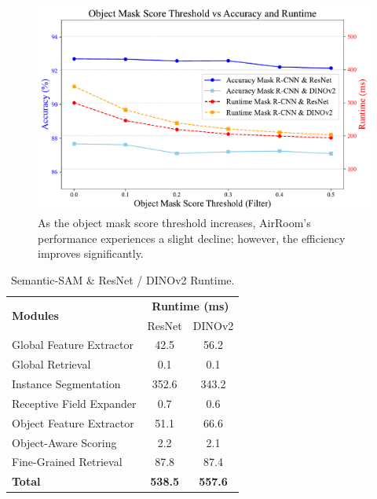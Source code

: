 \begin{table}[ht]
\centering
{}
\caption{Mask R-CNN \& ResNet / DINOv2 Accuracy.}
\label{tab:module_accuracy}
\end{table}

\begin{figure}[ht]
    \centering
    \includegraphics[width=\columnwidth]{runtime.pdf}
    \caption{As the object mask score threshold increases, AirRoom's performance experiences a slight decline; however, the efficiency improves significantly.}
    \label{fig:runtime}
\end{figure}

\begin{table}[ht]
\centering
\begin{tabular}{l|cc}
\toprule
\multirow{2}{*}{\textbf{Modules}} & \multicolumn{2}{c}{\textbf{Runtime (ms)}} \\
 & ResNet & DINOv2 \\
\midrule
Global Feature Extractor & 42.5 & 56.2 \\
Global Retrieval & 0.1 & 0.1 \\
Instance Segmentation & 352.6 & 343.2 \\
Receptive Field Expander & 0.7 & 0.6 \\
Object Feature Extractor & 51.1 & 66.6 \\
Object-Aware Scoring & 2.2 & 2.1 \\
Fine-Grained Retrieval & 87.8 & 87.4 \\
\midrule
\textbf{Total} & \textbf{538.5} & \textbf{557.6} \\
\bottomrule
\end{tabular}%
\caption{Semantic-SAM \& ResNet / DINOv2 Runtime.}
\label{tab:module_runtime_ssam}
\end{table}

